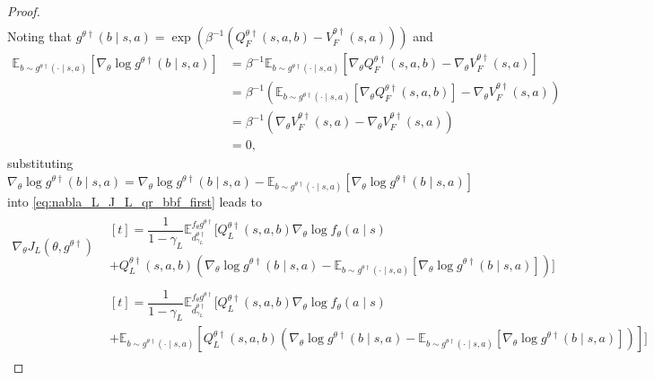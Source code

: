 \documentclass[letterpaper]{article} %
\providecommand{\E}{\mathbb{E}} %
\begin{document}
\begin{proof}
\begin{subequations}
\begin{align}
\end{align}
\end{subequations}
Noting that $g^{\theta \dagger}(b\mid s,a)=\exp\left(\beta^{-1}\left(Q_F^{\theta\dagger}(s,a,b)-V_F^{\theta\dagger}(s,a)\right)\right)$ and 
\begin{subequations}
\begin{align}
    \E_{b\sim g^{\theta \dagger}(\cdot\mid s,a)} \left[ \nabla_{\theta}\log g^{\theta \dagger}(b\mid s,a) \right]
    &=\beta^{-1} \E_{b\sim g^{\theta \dagger}(\cdot\mid s,a)} \left[\nabla_{\theta}Q_F^{\theta\dagger}(s,a,b)-\nabla_{\theta}V_F^{\theta\dagger}(s,a)\right]\\
    &=\beta^{-1}\left( \E_{b\sim g^{\theta \dagger}(\cdot\mid s,a)} \left[\nabla_{\theta}Q_F^{\theta\dagger}(s,a,b)\right] - \nabla_{\theta}V_F^{\theta\dagger}(s,a)\right)\\
    &=\beta^{-1} \left( \nabla_{\theta}V_F^{\theta\dagger}(s,a) - \nabla_{\theta}V_F^{\theta\dagger}(s,a) \right)\\
    & = 0,
\end{align}\label{eq:exp-nabla-log}
\end{subequations}
substituting $\nabla_{\theta}\log g^{\theta \dagger}(b\mid s,a) = \nabla_{\theta}\log g^{\theta \dagger}(b\mid s,a) - \E_{b\sim g^{\theta \dagger}(\cdot\mid s,a)} \left[ \nabla_{\theta}\log g^{\theta \dagger}(b\mid s,a) \right]$ into
\eqref{eq:nabla_L_J_L_qr_bbf_first} leads to
\begin{subequations}
\begin{align}
    \nabla_{\theta}J_L(\theta, g^{\theta\dagger})
    &\begin{multlined}[t]
        =\dfrac{1}{1-\gamma_L}\E_{d_{\gamma_L}^{\theta\dagger}}^{f_{\theta}g^{\theta \dagger}}\Big[Q_L^{\theta \dagger}(s,a,b)\nabla_{\theta}\log f_{\theta}(a\mid s)\\
        +Q_L^{\theta \dagger}(s,a,b)\left(\nabla_{\theta}\log g^{\theta \dagger}(b\mid s,a)-\E_{b\sim g^{\theta \dagger}(\cdot\mid s,a)}\left[\nabla_{\theta}\log g^{\theta \dagger}(b\mid s,a)\right]\right)\Big]
    \end{multlined}\\
    &\begin{multlined}[t]
        =\dfrac{1}{1-\gamma_L}\E_{d_{\gamma_L}^{\theta\dagger}}^{f_{\theta}g^{\theta \dagger}}\Big[Q_L^{\theta \dagger}(s,a,b)\nabla_{\theta}\log f_{\theta}(a\mid s)\\
        +\E_{b\sim g^{\theta \dagger}(\cdot\mid s,a)}\left[Q_L^{\theta \dagger}(s,a,b)\left(\nabla_{\theta}\log g^{\theta \dagger}(b\mid s,a)-\E_{b\sim g^{\theta \dagger}(\cdot\mid s,a)}\left[\nabla_{\theta}\log g^{\theta \dagger}(b\mid s,a)\right]\right)\right]\Big]

\end{multlined}
\end{align}
\end{subequations}
\end{proof}
\end{document}
